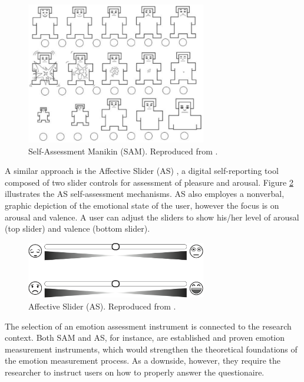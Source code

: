 \begin{figure}[h]
    \centering
    \includegraphics[width=0.7\textwidth]{Content/figures/SAM.png}
    \caption{Self-Assessment Manikin (SAM). Reproduced from \textcite{morris1995observations}.}
    \label{fig:sam}
\end{figure}

A similar approach is the Affective Slider (AS) \parencite{betella2016affective}, a digital self-reporting tool composed of two slider controls for assessment of pleasure and arousal. Figure \ref{fig:as} illustrates the AS self-assessment mechanisms. AS also employes a nonverbal, graphic depiction of the emotional state of the user, however the focus is on arousal and valence. A user can adjust the sliders to show his/her level of arousal (top slider) and valence (bottom slider).

\begin{figure}[h]
    \centering
    \includegraphics[width=0.7\textwidth]{Content/figures/AS.png}
    \caption{Affective Slider (AS). Reproduced from \textcite{betella2016affective}.}
    \label{fig:as}
\end{figure}

The selection of an emotion assessment instrument is connected to the research context. Both SAM and AS, for instance, are established and proven emotion measurement instruments, which would strengthen the theoretical foundations of the emotion measurement process. As a downside, however, they require the researcher to instruct users on how to properly answer the questionaire.
